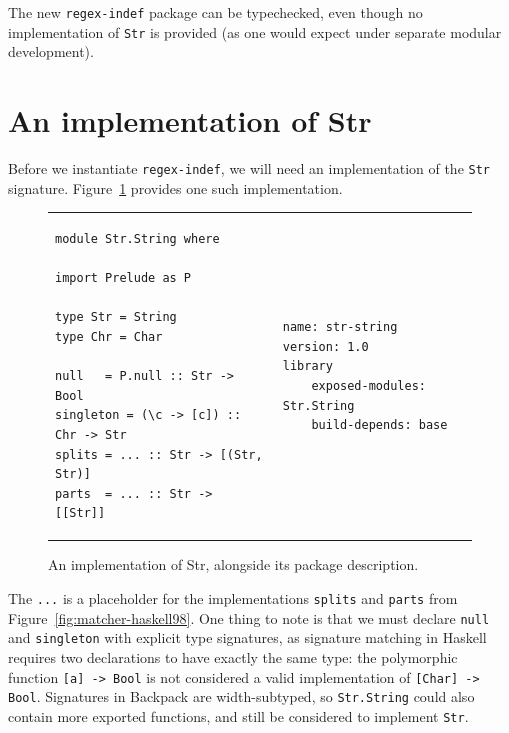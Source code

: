 The new \verb|regex-indef| package can be typechecked, even though no
implementation of \verb|Str| is provided (as one would expect under
separate modular development).

\section{An implementation of Str}

Before we instantiate \verb|regex-indef|, we will need an implementation
of the \verb|Str| signature.  Figure~\ref{fig:matcher-str-string-source}
provides one such implementation.

\begin{figure}
\begin{tabular}{p{} p{}}
\begin{lstlisting}
module Str.String where

import Prelude as P

type Str = String
type Chr = Char

null   = P.null :: Str -> Bool
singleton = (\c -> [c]) :: Chr -> Str
splits = ... :: Str -> [(Str, Str)]
parts  = ... :: Str -> [[Str]]
\end{lstlisting}
&
\begin{lstlisting}[language=Cabal]
name: str-string
version: 1.0
library
    exposed-modules: Str.String
    build-depends: base
\end{lstlisting}
\end{tabular}
\caption{An implementation of Str, alongside its package description.}
\label{fig:matcher-str-string-source}
\end{figure}

The \verb|...| is a placeholder for the implementations \verb|splits|
and \verb|parts| from Figure~\ref{fig:matcher-haskell98}. One thing to
note is that we must declare \verb|null| and \verb|singleton| with
explicit type signatures, as signature matching in Haskell requires two
declarations to have exactly the same type: the polymorphic function
\verb|[a] -> Bool| is not considered a valid implementation of
\verb|[Char] -> Bool|.  Signatures in Backpack are width-subtyped, so
\verb|Str.String| could also contain more exported functions, and still
be considered to implement \verb|Str|.


